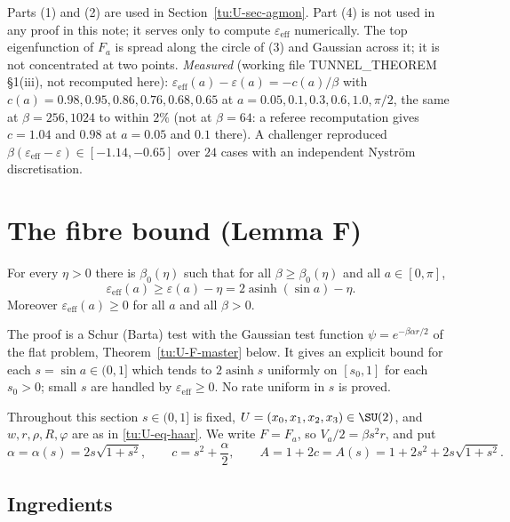\begin{remark}\label{tu:U-R-rem}
Parts (1) and (2) are used in Section~\ref{tu:U-sec-agmon}. Part (4) is not used in any proof in this
note; it serves only to compute $\varepsilon_{\mathrm{eff}}$ numerically. The top eigenfunction of $F_a$ is
spread along the circle of (3) and Gaussian across it; it is not concentrated at two points.
\emph{Measured} (working file TUNNEL\_THEOREM \S1(iii), not recomputed here):
$\varepsilon_{\mathrm{eff}}(a)-\varepsilon(a)=-c(a)/\beta$ with $c(a)=0.98,0.95,0.86,0.76,0.68,0.65$ at
$a=0.05,0.1,0.3,0.6,1.0,\pi/2$, the same at $\beta=256,1024$ to within $2\%$ (not at $\beta=64$: a referee
recomputation gives $c=1.04$ and $0.98$ at $a=0.05$ and $0.1$ there). A challenger
reproduced $\beta(\varepsilon_{\mathrm{eff}}-\varepsilon)\in[-1.14,-0.65]$ over $24$ cases with an independent
Nystr\"om discretisation.
\end{remark}

\section{The fibre bound (Lemma F)}\label{tu:U-sec-F}

\begin{lemma}[Lemma F]\label{tu:U-F}
For every $\eta>0$ there is $\beta_0(\eta)$ such that for all $\beta\ge\beta_0(\eta)$ and all $a\in[0,\pi]$,
\[
\varepsilon_{\mathrm{eff}}(a)\ge\varepsilon(a)-\eta=2\operatorname{asinh}(\sin a)-\eta .
\]
Moreover $\varepsilon_{\mathrm{eff}}(a)\ge0$ for all $a$ and all $\beta>0$.
\end{lemma}

The proof is a Schur (Barta) test with the Gaussian test function $\psi=e^{-\beta\alpha r/2}$ of the flat
problem, Theorem~\ref{tu:U-F-master} below. It gives an explicit bound for each $s=\sin a\in(0,1]$ which
tends to $2\operatorname{asinh}s$ uniformly on $[s_0,1]$ for each $s_0>0$; small $s$ are handled by
$\varepsilon_{\mathrm{eff}}\ge0$. No rate uniform in $s$ is proved.

Throughout this section $s\in(0,1]$ is fixed, $U=(x_0,x_1,x_2,x_3)\in\SU(2)$, and $w,r,\rho,R,\varphi$ are as in
\eqref{tu:U-eq-haar}. We write $F=F_a$, so $V_a/2=\beta s^2r$, and put
\[
\alpha=\alpha(s)=2s\sqrt{1+s^2},\qquad c=s^2+\frac\alpha2,\qquad A=1+2c=A(s)=1+2s^2+2s\sqrt{1+s^2}.
\]

\subsection{Ingredients}

